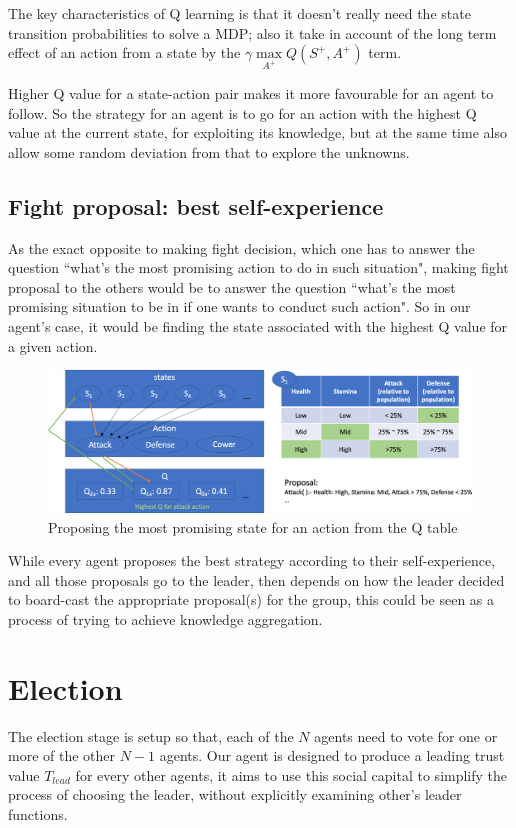 The key characteristics of Q learning is that it doesn't really need the state transition probabilities to solve a MDP; also it take in account of the long term effect of an action from a state by the $\gamma \max\limits_{A^+} Q(S^+,A^+)$ term.

Higher Q value for a state-action pair makes it more favourable for an agent to follow. So the strategy for an agent is to go for an action with the highest Q value at the current state, for exploiting its knowledge, but at the same time also allow some random deviation from that to explore the unknowns.

\subsection{Fight proposal: best self-experience}
As the exact opposite to making fight decision, which one has to answer the question ``what's the most promising action to do in such situation", making fight proposal to the others would be to answer the question ``what's the most promising situation to be in if one wants to conduct such action". So in our agent's case, it would be finding the state associated with the highest Q value for a given action.

\begin{figure}[!ht]
    \centering
    \includegraphics[width=1\textwidth]{008_team_5_agent_design/images/proposal_from_qtable.png}
    \caption{Proposing the most promising state for an action from the Q table}
    \label{fig:proposal_from_qtable}
\end{figure}

While every agent proposes the best strategy according to their self-experience, and all those proposals go to the leader, then depends on how the leader decided to board-cast the appropriate proposal(s) for the group, this could be seen as a process of trying to achieve knowledge aggregation.

\section{Election}
The election stage is setup so that, each of the $N$ agents need to vote for one or more of the other $N-1$ agents. Our agent is designed to produce a leading trust value $T_{lead}$ for every other agents, it aims to use this social capital to simplify the process of choosing the leader, without explicitly examining other's leader functions.

